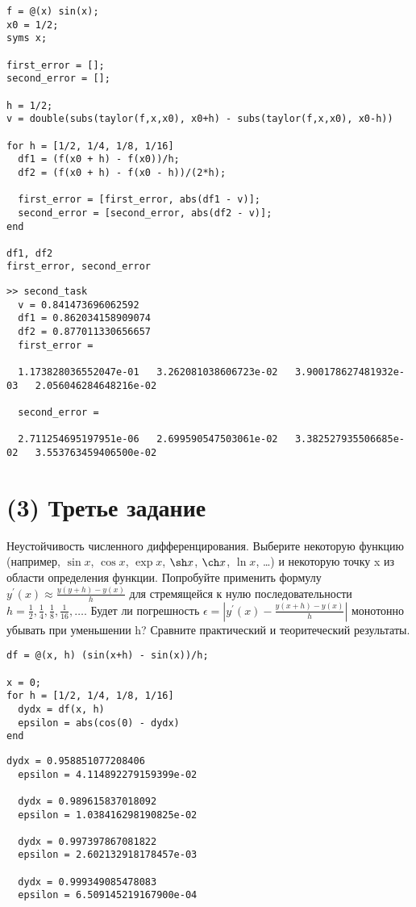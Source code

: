 \begin{lstlisting}
f = @(x) sin(x);
x0 = 1/2;
syms x;

first_error = [];
second_error = [];

h = 1/2;
v = double(subs(taylor(f,x,x0), x0+h) - subs(taylor(f,x,x0), x0-h))

for h = [1/2, 1/4, 1/8, 1/16]
  df1 = (f(x0 + h) - f(x0))/h;
  df2 = (f(x0 + h) - f(x0 - h))/(2*h);

  first_error = [first_error, abs(df1 - v)];
  second_error = [second_error, abs(df2 - v)];
end

df1, df2
first_error, second_error
\end{lstlisting}

\begin{lstlisting}[backgroundcolor=\color{cyan}]
  >> second_task
  v = 0.841473696062592
  df1 = 0.862034158909074
  df2 = 0.877011330656657
  first_error =

  1.173828036552047e-01   3.262081038606723e-02   3.900178627481932e-03   2.056046284648216e-02

  second_error =

  2.711254695197951e-06   2.699590547503061e-02   3.382527935506685e-02   3.553763459406500e-02
\end{lstlisting}


\section{(3) Третье задание}
Неустойчивость численного дифференцирования. Выберите некоторую функцию (например, $\sin x$, $\cos x$, $\exp x$, $\sh x$, $\ch x$, $\ln x$, \ldots) и некоторую точку x из области определения функции. Попробуйте применить формулу $y^{'}(x) \approx \frac{y(y+h) - y(x)}{h}$ для стремящейся к нулю последовательности $h = \frac{1}{2}, \frac{1}{4}, \frac{1}{8}, \frac{1}{16}, \ldots$. Будет ли погрешность $\epsilon = \left |y^{'}(x) - \frac{y(x+h) - y(x)}{h} \right |$ монотонно убывать при уменьшении h? Сравните практический и теоритеческий результаты.\\[5mm]

\begin{lstlisting}
df = @(x, h) (sin(x+h) - sin(x))/h;

x = 0;
for h = [1/2, 1/4, 1/8, 1/16]
  dydx = df(x, h)
  epsilon = abs(cos(0) - dydx)
end
\end{lstlisting}

\begin{lstlisting}[backgroundcolor=\color{cyan}]
  dydx = 0.958851077208406
  epsilon = 4.114892279159399e-02

  dydx = 0.989615837018092
  epsilon = 1.038416298190825e-02

  dydx = 0.997397867081822
  epsilon = 2.602132918178457e-03

  dydx = 0.999349085478083
  epsilon = 6.509145219167900e-04
\end{lstlisting}
